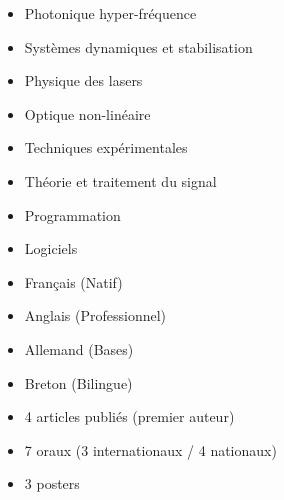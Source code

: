 

\vspace{-0.1em}



\begin{itemize}
	\item {Photonique hyper-fréquence}
	\item {Systèmes dynamiques et stabilisation}
	\item {Physique des lasers}
	\item {Optique non-linéaire}
	\item {Techniques expérimentales}
	\item {Théorie et traitement du signal}
\end{itemize}

\divider


\begin{itemize}
\item Programmation

\smallskip
{}	

\medskip

\item Logiciels

\smallskip
{}
\end{itemize}

\divider


\begin{itemize}
\item Français (Natif)
\item Anglais (Professionnel)
\item Allemand (Bases)
\item Breton (Bilingue)

\end{itemize}

\medskip
{}

\begin{itemize}
	\item 4 articles publiés (premier auteur)
\end{itemize}

\begin{itemize}
	\item 7 oraux (3 internationaux / 4 nationaux)
	\item 3 posters
\end{itemize}

